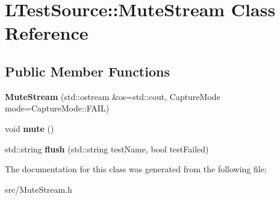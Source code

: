 \hypertarget{class_l_test_source_1_1_mute_stream}{\section{L\-Test\-Source\-:\-:Mute\-Stream Class Reference}
\label{class_l_test_source_1_1_mute_stream}
}
\subsection*{Public Member Functions}
\begin{DoxyCompactItemize}
\item 
\hypertarget{class_l_test_source_1_1_mute_stream_af9ce835dae87dca431da33386c76a64c}{{\bfseries Mute\-Stream} (std\-::ostream \&os=std\-::cout, Capture\-Mode mode=Capture\-Mode\-::\-F\-A\-I\-L)}\label{class_l_test_source_1_1_mute_stream_af9ce835dae87dca431da33386c76a64c}

\item 
\hypertarget{class_l_test_source_1_1_mute_stream_a192cea57f853ca5b872d1e429e42de11}{void {\bfseries mute} ()}\label{class_l_test_source_1_1_mute_stream_a192cea57f853ca5b872d1e429e42de11}

\item 
\hypertarget{class_l_test_source_1_1_mute_stream_a518ae5129e96db634d91949dbd6a7efd}{std\-::string {\bfseries flush} (std\-::string test\-Name, bool test\-Failed)}\label{class_l_test_source_1_1_mute_stream_a518ae5129e96db634d91949dbd6a7efd}

\end{DoxyCompactItemize}


The documentation for this class was generated from the following file\-:\begin{DoxyCompactItemize}
\item 
src/Mute\-Stream.\-h\end{DoxyCompactItemize}
